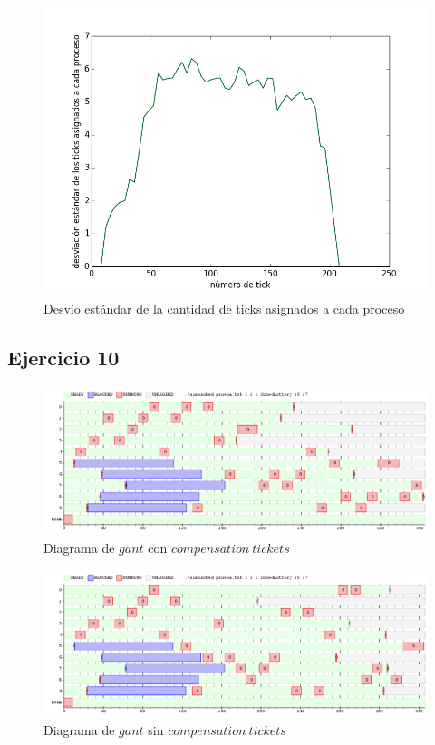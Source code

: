 \documentclass[a4paper]{article}
\begin{document}
\begin{figure}[H]
\centering
\includegraphics[scale=0.66]{../experimentacion/ej9-fairness/fairness/plot.png}
\caption{Desvío estándar de la cantidad de ticks asignados a cada proceso}
\end{figure}

\newpage
\subsection{Ejercicio 10}

\begin{figure}[H]
\centering
\includegraphics[scale=0.5]{../experimentacion/ej10-compensation/gant-sin.png}
\caption{Diagrama de $gant$ con $compensation\ tickets$}
\end{figure}

\begin{figure}[H]
\centering
\includegraphics[scale=0.5]{../experimentacion/ej10-compensation/gant-con.png}
\caption{Diagrama de $gant$ sin $compensation\ tickets$}
\end{figure}
\end{document}
